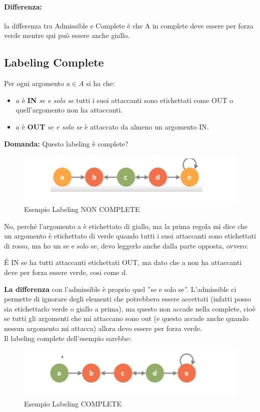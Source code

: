\paragraph{Differenza:} la differenza tra Admissible e Complete
è che A in complete deve essere per forza verde mentre qui può essere anche
giallo.

\subsection{Labeling Complete}
Per ogni argomento $a \in A$ si ha che:
\begin{itemize}
    \item  $a$ è \textbf{IN} \textit{se e solo se} tutti i suoi attaccanti
          sono etichettati come OUT o quell'argomento non ha attaccanti.
    \item $a$ è \textbf{OUT} \textit{se e solo se} è attaccato da almeno un
          argomento IN.
\end{itemize}
\textbf{Domanda: } Questo labeling è complete?
\begin{figure}[H]
    \centering
    \includegraphics[width=12cm, keepaspectratio]{img/Cap7/LC.png}
    \caption{Esempio Labeling NON COMPLETE}
\end{figure}
No, perché l'argomento a è etichettato di giallo, ma la prima regola mi
dice che un argomento è etichettato di verde quando tutti i suoi attaccanti
sono etichettati di rosso, ma ho un se e solo se, devo leggerlo anche dalla
parte opposta, ovvero:

\vspace{0.3cm}
\noindent É IN se ha tutti attaccanti etichettati OUT, ma dato che a non ha
attaccanti deve per forza essere verde, cosi come d.

\vspace{0.3cm}

\noindent \textbf{La differenza} con l'admissible è proprio quel ”se e solo
se”. L'admissible ci permette di ignorare degli elementi che potrebbero
essere accettati (infatti posso sia etichettarlo verde o giallo a prima), ma
questo non accade nella complete, cioè se tutti gli argomenti che mi
attaccano sono out (e questo accade anche quando nessun argomento mi
attacca) allora devo essere per forza verde. \\
Il labeling complete dell'esempio sarebbe:
\begin{figure}[H]
    \centering
    \includegraphics[width=12cm, keepaspectratio]{img/Cap7/LC2.png}
    \caption{Esempio Labeling COMPLETE}
\end{figure}

